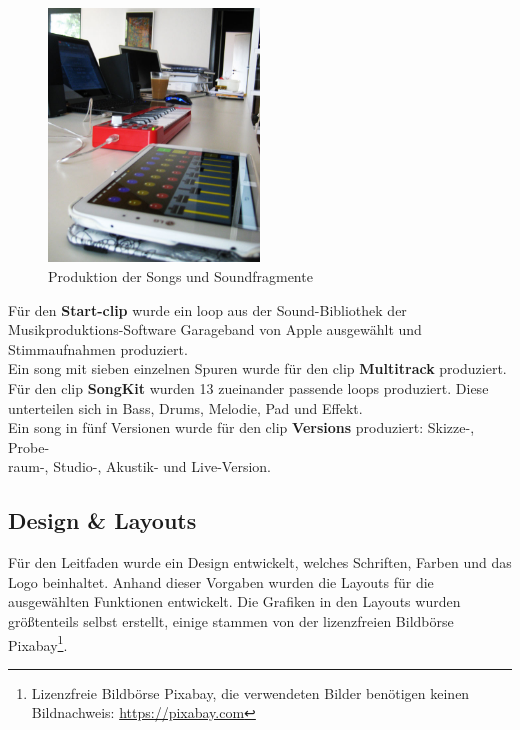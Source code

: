\begin{figure}[H]
\centering
\includegraphics[width=0.5\textwidth]{grafiken/musikproduktion.jpg}
\caption{Produktion der Songs und Soundfragmente}
\end{figure}

Für den \textbf{Start-\gls{clip}} wurde ein \gls{loop} aus der Sound-Bibliothek der Musikproduktions-Software Garageband von Apple ausgewählt und Stimmaufnahmen produziert.\\

Ein \gls{song} mit sieben einzelnen Spuren wurde für den \gls{clip} \textbf{Multitrack} produziert.\\

Für den \gls{clip} \textbf{SongKit} wurden 13 zueinander passende \gls{loop}s produziert. Diese unterteilen sich in Bass, Drums, Melodie, Pad und Effekt.\\

Ein \gls{song} in fünf Versionen wurde für den \gls{clip} \textbf{Versions} produziert: Skizze-, Probe-\\raum-, Studio-, Akustik- und Live-Version. 




\subsection{Design \& Layouts}\label{design}
Für den Leitfaden wurde ein Design entwickelt, welches Schriften, Farben und das Logo beinhaltet. Anhand dieser Vorgaben wurden die Layouts für die ausgewählten Funktionen entwickelt. Die Grafiken in den Layouts wurden größtenteils selbst erstellt, einige stammen von der lizenzfreien Bildbörse Pixabay\footnote{Lizenzfreie Bildbörse Pixabay, die verwendeten Bilder benötigen keinen Bildnachweis: \url{https://pixabay.com}}.

